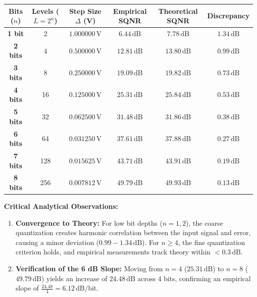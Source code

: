 \documentclass[11pt,a4paper]{article}
\begin{document}
\begin{center}
\begin{tabular}{|c|c|c|c|c|c|}
\hline
\textbf{Bits ($n$)} & \textbf{Levels ($L = 2^n$)} & \textbf{Step Size $\Delta$ (V)} & \textbf{Empirical SQNR} & \textbf{Theoretical SQNR} & \textbf{Discrepancy} \\
\hline
\textbf{1 bit} & 2 & $1.000000\,\mathrm{V}$ & $6.44\,\mathrm{dB}$ & $7.78\,\mathrm{dB}$ & $1.34\,\mathrm{dB}$ \\
\textbf{2 bits} & 4 & $0.500000\,\mathrm{V}$ & $12.81\,\mathrm{dB}$ & $13.80\,\mathrm{dB}$ & $0.99\,\mathrm{dB}$ \\
\textbf{3 bits} & 8 & $0.250000\,\mathrm{V}$ & $19.09\,\mathrm{dB}$ & $19.82\,\mathrm{dB}$ & $0.73\,\mathrm{dB}$ \\
\textbf{4 bits} & 16 & $0.125000\,\mathrm{V}$ & $25.31\,\mathrm{dB}$ & $25.84\,\mathrm{dB}$ & $0.53\,\mathrm{dB}$ \\
\textbf{5 bits} & 32 & $0.062500\,\mathrm{V}$ & $31.48\,\mathrm{dB}$ & $31.86\,\mathrm{dB}$ & $0.38\,\mathrm{dB}$ \\
\textbf{6 bits} & 64 & $0.031250\,\mathrm{V}$ & $37.61\,\mathrm{dB}$ & $37.88\,\mathrm{dB}$ & $0.27\,\mathrm{dB}$ \\
\textbf{7 bits} & 128 & $0.015625\,\mathrm{V}$ & $43.71\,\mathrm{dB}$ & $43.91\,\mathrm{dB}$ & $0.19\,\mathrm{dB}$ \\
\textbf{8 bits} & 256 & $0.007812\,\mathrm{V}$ & $49.79\,\mathrm{dB}$ & $49.93\,\mathrm{dB}$ & $0.13\,\mathrm{dB}$ \\
\hline
\end{tabular}
\end{center}

\vspace{3mm}
\noindent\textbf{Critical Analytical Observations:}
\begin{enumerate}
    \item \textbf{Convergence to Theory:} For low bit depths ($n = 1, 2$), the coarse quantization creates harmonic correlation between the input signal and error, causing a minor deviation ($0.99 - 1.34\,\mathrm{dB}$). For $n \ge 4$, the fine quantization criterion holds, and empirical measurements track theory within $< 0.3\,\mathrm{dB}$.
    \item \textbf{Verification of the 6 dB Slope:} Moving from $n=4$ ($25.31\,\mathrm{dB}$) to $n=8$ ($49.79\,\mathrm{dB}$) yields an increase of $24.48\,\mathrm{dB}$ across 4 bits, confirming an empirical slope of $\frac{24.48}{4} = \mathbf{6.12\,\mathrm{dB/bit}}$.
\end{enumerate}
\end{document}
